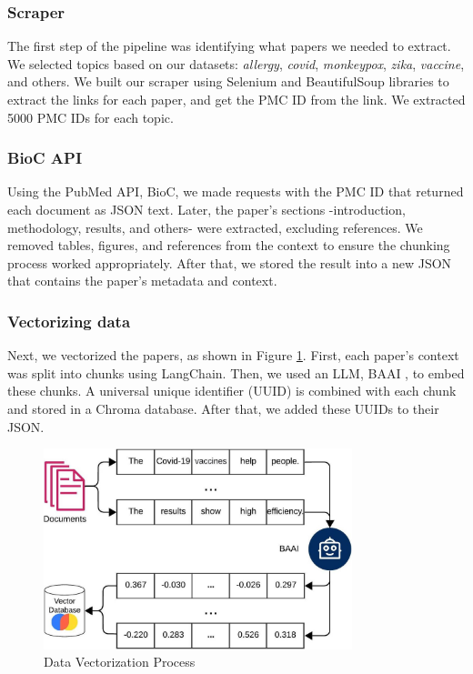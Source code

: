 \subsubsection{Scraper}
The first step of the pipeline was identifying what papers we needed to extract. We selected topics based on our datasets: \textit{allergy}, \textit{covid}, \textit{monkeypox}, \textit{zika}, \textit{vaccine}, and others. We built our scraper using Selenium and BeautifulSoup libraries to extract the links for each paper, and get the PMC ID  from the link.  We extracted 5000 PMC IDs for each topic.

\subsubsection{BioC API}
Using the PubMed API, BioC, we made requests with the PMC ID that returned each document as JSON text. Later, the paper's sections -introduction, methodology, results, and others- were extracted, excluding references. We removed tables, figures, and references from the context to ensure the chunking process worked appropriately. After that, we stored the result into a new JSON that contains the paper's metadata and context. 

\subsubsection{Vectorizing data}
Next, we vectorized the papers, as shown in Figure \ref{fig:vector}. First, each paper’s context was split into chunks using LangChain. Then, we used an LLM, BAAI \cite{bge_embedding}, to embed these chunks. A universal unique identifier (UUID) is combined with each chunk and stored in a Chroma database. After that, we added these UUIDs to their JSON. 

\begin{figure}[!htb]
	\begin{center}
		\includegraphics[width=0.8\textwidth]{figures/Data_vectorization.jpeg} %
	\end{center}
	\caption{Data Vectorization Process} %
	\label{fig:vector}
\end{figure}


